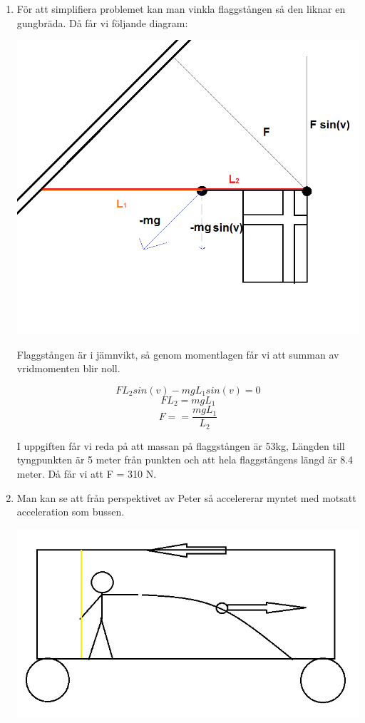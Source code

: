\documentclass[a4paper,12pt]{article}
\begin{document}
\begin{enumerate}
      \item
            För att simplifiera problemet kan man vinkla flaggstången så den liknar
            en gungbräda. Då får vi följande diagram:

            \includegraphics[scale=0.55]{Figur2.png}

            Flaggstången är i jämnvikt, så genom momentlagen får vi att summan av vridmomenten
            blir noll.

            $$FL_2sin(v)-mgL_1sin(v)=0$$
            $$FL_2=mgL_1$$
            $$F==\frac{mgL_1}{L_2}$$

            I uppgiften får vi reda på att massan på flaggstången är 53kg, Längden till
            tyngpunkten är 5 meter från punkten och att hela flaggstångens längd
            är 8.4 meter. Då får vi att F = 310 N.

      \item

            Man kan se att från perspektivet av Peter så accelererar myntet
            med motsatt acceleration som bussen.

            \includegraphics[scale=0.5]{Figur3.png}


\end{enumerate}
\end{document}
